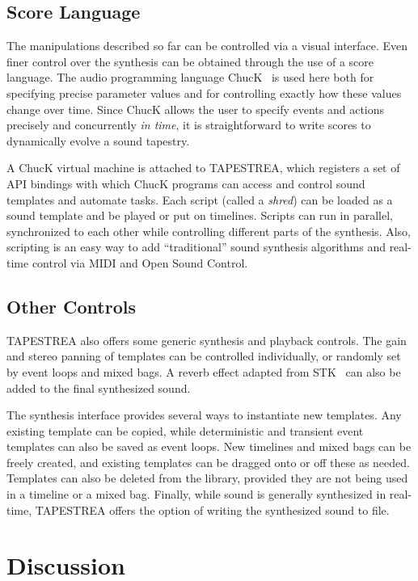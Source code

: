 \documentclass[10pt,letterpaper]{article}
\begin{document}
\subsection{Score Language}

The manipulations described so far can be controlled via a
visual interface. Even finer control over the synthesis can be obtained
through the use of a score language. The audio programming language
ChucK~\cite{Wang03} is used here both for specifying precise
parameter values and for controlling exactly how these values change
over time.  Since ChucK allows the user to specify events and actions
precisely and concurrently \textit{in time}, it is straightforward to write
scores to dynamically evolve a sound tapestry.

A ChucK virtual machine is attached to TAPESTREA, which registers a
set of API bindings with which ChucK programs can access and control
sound templates and automate tasks.  Each script
(called a \textit{shred}) can be loaded as a sound template and be played
or put on timelines.  
Scripts can run in parallel, synchronized
to each other while controlling different parts of the synthesis.  Also, scripting
is an easy way to add ``traditional'' sound synthesis algorithms and real-time
control via MIDI and Open Sound Control.

\subsection{Other Controls}

TAPESTREA also offers some generic synthesis and playback controls. The gain and stereo panning of templates can be controlled individually, or randomly set by event loops and mixed bags. A reverb effect adapted from STK~\cite{Cook99} can also be added to the final synthesized sound.

The synthesis interface provides several ways to instantiate
new templates. Any existing template can be copied, while deterministic
and transient event templates can also be saved as event loops. New
timelines and mixed bags can be freely created, and existing templates
can be dragged onto or off these as needed. Templates can also be
deleted from the library, provided they are not being used in a timeline
or a mixed bag. Finally, while sound is generally synthesized in
real-time, TAPESTREA offers the option of writing the synthesized sound
to file.

\section{Discussion}
\end{document}
